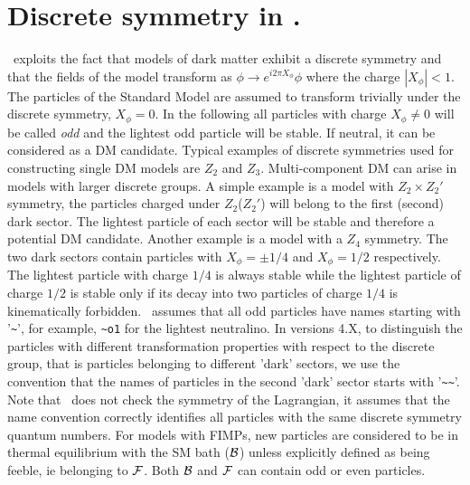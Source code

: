 \documentclass[12pt,a4paper]{article}
\begin{document}
 
\section{Discrete symmetry in \micro.}

 \micro\ exploits the fact that models of dark matter exhibit a discrete symmetry
and that the fields  of the model transform as 
$   \phi \to e^{i2\pi X_{\phi}} \phi$
where the charge $|X_{\phi}|<1$. 
The particles of the  Standard Model 
are assumed to transform trivially under the discrete symmetry, $X_\phi=0$. In the following all particles with
 charge $X_\phi\neq 0$  will be called 
 {\it odd} and the  lightest odd particle  will be  stable. If neutral, it can be considered as a DM candidate.
Typical  examples  of discrete symmetries used for constructing single DM models  are $Z_2$ and  $Z_3$. 
Multi-component DM can arise in models with larger discrete groups. A simple 
example is a model with  $Z_2\times Z_2'$ symmetry, the particles charged under  $Z_2$($Z_2'$) will belong to the first (second) dark sector. The lightest particle of each sector  will be stable and therefore a potential DM candidate. 
Another example is a model with a $Z_4$  symmetry.  The two dark sectors contain particles with $X_\phi=\pm 1/4$ and $X_\phi=1/2$ respectively. The lightest particle with  charge $1/4$ is always stable while the lightest particle of charge $1/2$ is stable only if its decay into two particles of charge $1/4$ is kinematically forbidden.
 \micro\ assumes that all odd particles have  names
starting with '\verb|~|', for example, \verb|~o1| for the lightest  
neutralino. In versions 4.X, to distinguish the particles with different transformation properties with 
respect to the discrete group, that is particles belonging to different 'dark' sectors,
we use the convention that the names of particles in the second 'dark' sector starts with '\verb|~~|'. 
Note that \micro\ does not check the symmetry of the Lagrangian, it assumes that the name convention 
correctly identifies  all particles with the same discrete symmetry quantum numbers.
For models with FIMPs, new particles are considered to be in thermal equilibrium with the SM bath (${\cal B}$) unless explicitly defined as being feeble, ie belonging to ${\cal F}$. Both ${\cal B}$ and ${\cal F}$ can contain odd or even particles. 

  
\end{document}
